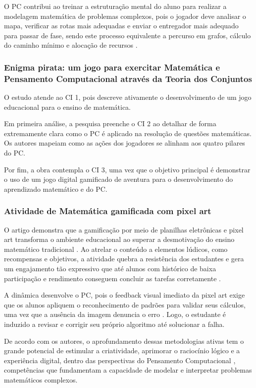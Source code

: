 \documentclass[12pt]{article}
\begin{document}
O PC contribui ao treinar a estruturação mental do aluno para realizar a modelagem matemática de problemas complexos, pois o jogador deve analisar o mapa, verificar as rotas mais adequadas e enviar o entregador mais adequado para passar de fase, sendo este processo equivalente a percurso em grafos, cálculo do caminho mínimo e alocação de recursos \cite{honda2023cade}.

\subsubsection{Enigma pirata: um jogo para exercitar Matemática e Pensamento Computacional através da Teoria dos Conjuntos}

O estudo atende ao CI 1, pois descreve ativamente o desenvolvimento de um jogo educacional para o ensino de matemática. 

Em primeira análise, a pesquisa preenche o CI 2 ao detalhar de forma extremamente clara como o PC é aplicado na resolução de questões matemáticas. Os autores mapeiam como as ações dos jogadores se alinham aos quatro pilares do PC. 

Por fim, a obra contempla o CI 3, uma vez que o objetivo principal é demonstrar o uso de um jogo digital gamificado de aventura para o desenvolvimento do aprendizado matemático e do PC.

\subsubsection{Atividade de Matemática gamificada com pixel art}
O artigo demonstra que a gamificação por meio de planilhas eletrônicas e pixel art transforma o ambiente educacional ao superar a desmotivação do ensino matemático tradicional \cite{teodosio2023atividade}. Ao atrelar o conteúdo a elementos lúdicos, como recompensas e objetivos, a atividade quebra a resistência dos estudantes e gera um engajamento tão expressivo que até alunos com histórico de baixa participação e rendimento conseguem concluir as tarefas corretamente \cite{teodosio2023atividade}. 

A dinâmica desenvolve o PC, pois o feedback visual imediato da pixel art exige que os alunos apliquem o reconhecimento de padrões para validar seus cálculos, uma vez que a ausência da imagem denuncia o erro \cite{teodosio2023atividade}. Logo, o estudante é induzido a revisar e corrigir seu próprio algoritmo até solucionar a falha.

De acordo com os autores, o aprofundamento dessas metodologias ativas tem o grande potencial de estimular a criatividade, aprimorar o raciocínio lógico e a experiência digital, dentro das perspectivas do Pensamento Computacional \cite{teodosio2023atividade}, competências que fundamentam a capacidade de modelar e interpretar problemas matemáticos complexos.
\end{document}
